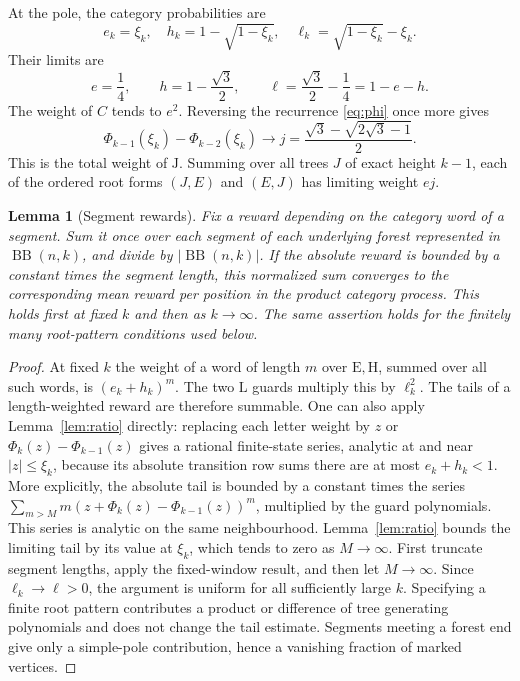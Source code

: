 \documentclass[11pt,a4paper]{article}
\newtheorem{lemma}[theorem]{Lemma}
\theoremstyle{definition}
\theoremstyle{remark}
\newcommand{\BB}{\operatorname{BB}}
\newcommand{\E}{\mathrm E}
\newcommand{\HH}{\mathrm H}
\newcommand{\LL}{\mathrm L}
\newcommand{\JJ}{\mathrm J}
\begin{document}
At the pole, the category probabilities are
\begin{equation}\label{eq:finiteweights}
e_k=\xi_k,\quad h_k=1-\sqrt{1-\xi_k},\quad
\ell_k=\sqrt{1-\xi_k}-\xi_k.
\end{equation}
Their limits are
\begin{equation}\label{eq:weights}
e=\frac14,\qquad h=1-\frac{\sqrt3}2,\qquad
\ell=\frac{\sqrt3}2-\frac14=1-e-h.
\end{equation}
The weight of $C$ tends to $e^2$. Reversing the recurrence \eqref{eq:phi} once more gives
\begin{equation}\label{eq:j}
\Phi_{k-1}(\xi_k)-\Phi_{k-2}(\xi_k)\longrightarrow
j=\frac{\sqrt3-\sqrt{2\sqrt3-1}}2.
\end{equation}
This is the total weight of $\JJ$. Summing over all trees $J$ of exact height $k-1$, each of the ordered root forms $(J,E)$ and $(E,J)$ has limiting weight $ej$.

\begin{lemma}[Segment rewards]\label{lem:segments}
Fix a reward depending on the category word of a segment. Sum it once over each segment of each underlying forest represented in $\BB(n,k)$, and divide by $|\BB(n,k)|$. If the absolute reward is bounded by a constant times the segment length, this normalized sum converges to the corresponding mean reward per position in the product category process. This holds first at fixed $k$ and then as $k\to\infty$. The same assertion holds for the finitely many root-pattern conditions used below.
\end{lemma}
\begin{proof}
At fixed $k$ the weight of a word of length $m$ over $\E,\HH$, summed over all such words, is $(e_k+h_k)^m$. The two $\LL$ guards multiply this by $\ell_k^2$. The tails of a length-weighted reward are therefore summable. One can also apply Lemma~\ref{lem:ratio} directly: replacing each letter weight by $z$ or $\Phi_k(z)-\Phi_{k-1}(z)$ gives a rational finite-state series, analytic at and near $|z|\le\xi_k$, because its absolute transition row sums there are at most $e_k+h_k<1$. More explicitly, the absolute tail is bounded by a constant times the series $\sum_{m>M}m(z+\Phi_k(z)-\Phi_{k-1}(z))^m$, multiplied by the guard polynomials. This series is analytic on the same neighbourhood. Lemma~\ref{lem:ratio} bounds the limiting tail by its value at $\xi_k$, which tends to zero as $M\to\infty$. First truncate segment lengths, apply the fixed-window result, and then let $M\to\infty$. Since $\ell_k\to\ell>0$, the argument is uniform for all sufficiently large $k$. Specifying a finite root pattern contributes a product or difference of tree generating polynomials and does not change the tail estimate. Segments meeting a forest end give only a simple-pole contribution, hence a vanishing fraction of marked vertices.
\end{proof}
\end{document}
